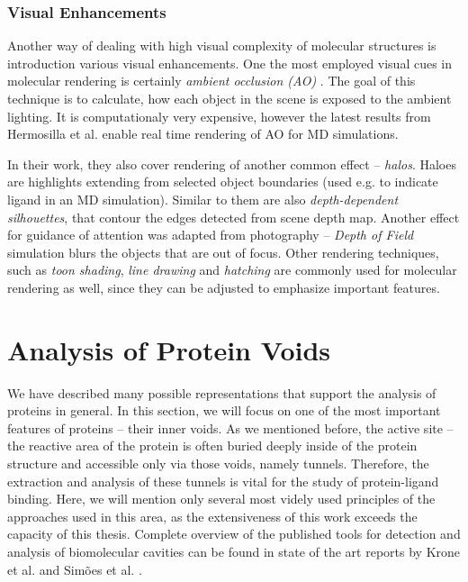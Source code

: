 \subsubsection{Visual Enhancements}
Another way of dealing with high visual complexity of molecular structures is introduction various visual enhancements. One the most employed visual cues in molecular rendering is certainly \textit{ambient occlusion (AO)} \cite{miller1994efficient}. The goal of this technique is to calculate, how each object in the scene is exposed to the ambient lighting. It is computationaly very expensive, however the latest results from Hermosilla et al. \cite{hermosilla2016high} enable real time rendering of AO for MD simulations.

In their work, they also cover rendering of another common effect -- \textit{halos}. Haloes are highlights extending from selected object boundaries (used e.g. to indicate ligand in an MD simulation). Similar to them are also \textit{depth-dependent silhouettes}, that contour the edges  detected from scene depth map. Another effect for guidance of attention was adapted from photography -- \textit{Depth of Field} simulation blurs the objects that are out of focus. 
Other rendering techniques, such as \textit{toon shading}, \textit{line drawing} and \textit{hatching} are commonly used for molecular rendering as well, since they can be adjusted to emphasize important features.


\section{Analysis of Protein Voids}
We have described many possible representations that support the analysis of proteins in general. In this section, we will focus on one of the most important features of proteins -- their inner voids. As we mentioned before, the active site -- the reactive area of the protein is often buried deeply inside of the protein structure and accessible only via those voids, namely tunnels. Therefore, the extraction and analysis of these tunnels is vital for the study of protein-ligand binding. Here, we will mention only several most videly used principles of the approaches used in this area, as the extensiveness of this work exceeds the capacity of this thesis. Complete overview of the published tools for detection and analysis of biomolecular cavities can be found in state of the art reports by Krone et al. \cite{krone2016visual} and Simões et al. \cite{simoesgeometric}.

